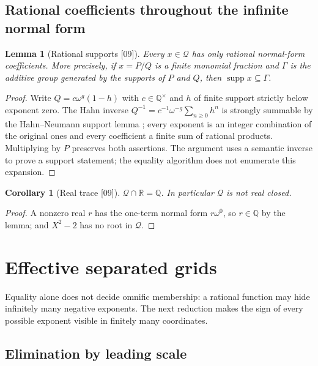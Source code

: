 \documentclass[11pt,oneside]{article}
\numberwithin{equation}{section}
\newtheorem{lemma}[lemma]{Lemma}
\newtheorem{corollary}[corollary]{Corollary}
\theoremstyle{definition}
\theoremstyle{remark}
\newcommand{\Q}{\mathbb Q}
\newcommand{\R}{\mathbb R}
\newcommand{\QO}{\mathcal Q}
\newcommand{\supp}{\operatorname{supp}}
\newcommand{\src}[1]{\textup{\textsf{\small[#1]}}}
\begin{document}
\subsection{Rational coefficients throughout the infinite normal form}

\begin{lemma}[Rational supports \src{09}]\label{onot:grid:lem:rationalsupport}
Every $x\in\QO$ has only rational normal-form coefficients. More precisely, if
$x=P/Q$ is a finite monomial fraction and $\Gamma$ is the additive group
generated by the supports of $P$ and $Q$, then $\supp x\subseteq\Gamma$.
\end{lemma}
\begin{proof}
Write $Q=c\omega^g(1-h)$ with $c\in\Q^\times$ and $h$ of finite support strictly
below exponent zero. The Hahn inverse
$Q^{-1}=c^{-1}\omega^{-g}\sum_{n\ge0}h^n$ is strongly summable by the
Hahn--Neumann support lemma \cite[Proposition~3.7]{Camacho}; every exponent is an
integer combination of the original ones and every coefficient a finite sum of
rational products. Multiplying by $P$ preserves both assertions. The argument
uses a semantic inverse to prove a support statement; the equality algorithm
does not enumerate this expansion.
\end{proof}

\begin{corollary}[Real trace \src{09}]\label{onot:grid:cor:realtrace}
$\QO\cap\R=\Q$. In particular $\QO$ is not real closed.
\end{corollary}
\begin{proof}
A nonzero real $r$ has the one-term normal form $r\omega^0$, so $r\in\Q$ by the
lemma; and $X^2-2$ has no root in $\QO$.
\end{proof}

\section{Effective separated grids}\label{onot:grid:sec:grid}

Equality alone does not decide omnific membership: a rational function may hide
infinitely many negative exponents. The next reduction makes the sign of every
possible exponent visible in finitely many coordinates.

\subsection{Elimination by leading scale}
\end{document}
